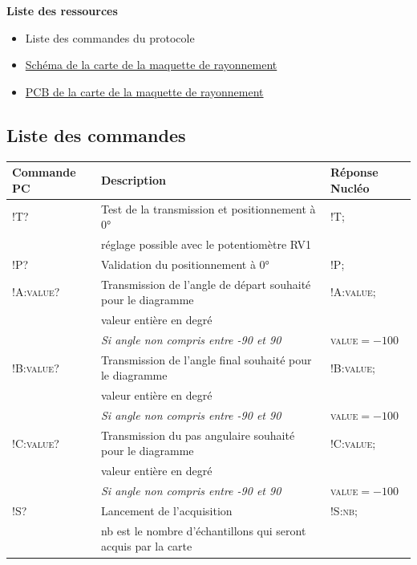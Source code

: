 \documentclass[a4paper,11pt,titlepage]{article} %
\begin{document}
\textbf{\large Liste des ressources}
\begin{itemize}
	\item Liste des commandes du protocole
	\item \hyperref[doc:robot_schematic]{Schéma de la carte de la maquette de rayonnement}
	\item \hyperref[doc:robot_pcb]{PCB de la carte de la maquette de rayonnement}
\end{itemize}


\subsection{Liste des commandes}

\begin{center}

\begin{tabular}{|l|l|l|}
\hline 
\textbf{Commande PC} & Description & \textbf{Réponse Nucléo} \\ 
\hline 
\textsc{!T?} & Test de la transmission et positionnement à 0°  & \textsc{!T;} \\ 
 &  réglage possible avec le potentiomètre RV1 &  \\  
\hline 
\textsc{!P?} & Validation du positionnement à 0° & \textsc{!P;} \\ 
\hline 
\textsc{!A:value?} & Transmission de l'angle de départ souhaité pour le diagramme & \textsc{!A:value;} \\ 
 &  valeur entière en degré &  \\
 & \textit{Si angle non compris entre -90 et 90} & \textsc{value}$ = -100$ \\ 
\hline 
\textsc{!B:value?} & Transmission de l'angle final souhaité pour le diagramme & \textsc{!B:value;} \\ 
 &  valeur entière en degré &  \\ 
 & \textit{Si angle non compris entre -90 et 90} & \textsc{value}$ = -100$ \\
\hline 
\textsc{!C:value?} & Transmission du pas angulaire souhaité pour le diagramme & \textsc{!C:value;} \\ 
 &  valeur entière en degré &  \\ 
 & \textit{Si angle non compris entre -90 et 90} & \textsc{value}$ = -100$ \\
\hline 
\textsc{!S?} & Lancement de l'acquisition & \textsc{!S:nb;} \\ 
 &  nb est le nombre d'échantillons qui seront acquis par la carte &  \\ 

\end{tabular}
\end{center}
\end{document}
